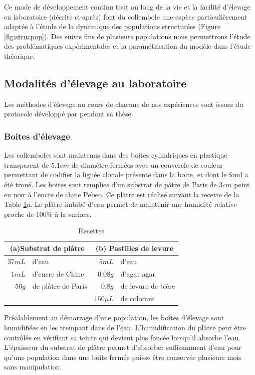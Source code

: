 Ce mode de développement continu tout au long de la vie et la facilité
d'élevage en laboratoire (décrite ci-après) font du collembole une espèce
particulièrement adaptée à l'étude de la dynamique des populations structurées
(Figure \ref{fig:strucpop}).
Des suivis fins de plusieurs populations nous permettrons l'étude des
problématiques expérimentales et la paramétrisation du modèle dans l'étude
théorique. 

\subsection{Modalités d'élevage au laboratoire}

Les méthodes d'élevage au cours de chacune de nos expériences sont issues du
protocole développé par \textcites{tully2004a} pendant sa thèse.

\subsubsection{Boites d'élevage}

Les collemboles sont maintenus dans des boites cylindriques en
plastique transparent de $5.1 cm$ de diamètre fermées avec un couvercle de
couleur permettant de codifier la lignée clonale présente dans la boite, et dont
le fond a été troué. Les boites sont remplies d'un substrat de pâtre de Paris de
$3cm$ peint en noir à l'encre de chine Pebeo\textcopyright. Ce plâtre est
réalisé suivant la recette de la Table \ref{tab:recettes}a. Le plâtre imbibé
d'eau permet de maintenir une humidité relative proche de $100\%$ à la surface.

\begin{table}[!h]
\begin{center}
\begin{tabular}{rl|rl}
\multicolumn{2}{c}{(a)Substrat de plâtre}&\multicolumn{2}{c}{(b) Pastilles de levure}\\
\hline 
$37mL$ & d'eau & $5mL$ & d'eau\\ 
$1mL$ & d'encre de Chine & $0.08g$ & d'agar agar \\ 
$50g$ & de plâtre de Paris & $0.8g$ & de levure de bière\\
& & $150\mu L$ & de colorant\\ 
\end{tabular} 
\caption[Recettes]{\label{tab:recettes}Recettes}
\end{center}
\end{table}

Préalablement au démarrage d'une population, les boîtes d'élevage sont
humidifiées en les trempant dans de l'eau. L'humidification du plâtre peut être
contrôlée en vérifiant sa teinte qui devient plus foncée lorsqu'il absorbe
l'eau. L'épaisseur du substrat de plâtre permet d'absorber suffisamment d'eau
pour qu'une population dans une boîte fermée puisse être conservée plusieurs
mois sans manipulation.

